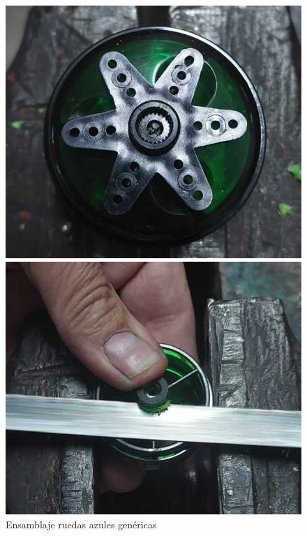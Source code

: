 \begin{figure}[ht!]
	\centering
	\begin{minipage}{0.40\linewidth}
		\centering
		\includegraphics[width=\linewidth]{figs/cap5/creacionra1.jpeg}

	\end{minipage}
	\hspace{2cm}
	\begin{minipage}{0.40\linewidth}
		\centering
		\includegraphics[width=\linewidth]{figs/cap5/creacionra2.jpeg}

	\end{minipage}
	\caption{Ensamblaje ruedas azules genéricas}
	\label{fig:rae}
\end{figure}


